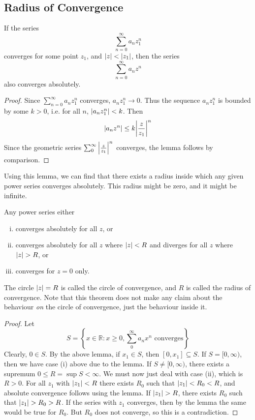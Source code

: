 \documentclass{article}
\begin{document}
\subsection{Radius of Convergence}
\begin{lemma}
    If the series
    \[ \sum_{n=0}^\infty a_n z_1^n \]
    converges for some point $z_1$, and $\abs{z} < \abs{z_1}$, then the series
    \[ \sum_{n=0}^\infty a_n z^n \]
    also converges absolutely.
\end{lemma}
\begin{proof}
    Since $\sum_{n=0}^\infty a_n z_1^n$ converges, $a_n z_1^n \to 0$. Thus the sequence $a_n z_1^n$ is bounded by some $k > 0$, i.e. for all $n$, $\abs{a_n z_1^n}<k$. Then
    \[ \abs{a_n z^n} \leq k\abs{\frac{z}{z_1}}^n \]
    Since the geometric series $\sum_0^\infty \abs{\frac{z}{z_1}}^n$ converges, the lemma follows by comparison.
\end{proof}
\noindent Using this lemma, we can find that there exists a radius inside which any given power series converges absolutely. This radius might be zero, and it might be infinite.
\begin{theorem}
    Any power series either
    \begin{enumerate}[(i)]
        \item converges absolutely for all $z$, or
        \item converges absolutely for all $z$ where $\abs{z} < R$ and diverges for all $z$ where $\abs{z} > R$, or
        \item converges for $z = 0$ only.
    \end{enumerate}
\end{theorem}
\noindent The circle $\abs{z} = R$ is called the circle of convergence, and $R$ is called the radius of convergence. Note that this theorem does not make any claim about the behaviour \textit{on} the circle of convergence, just the behaviour inside it.
\begin{proof}
    Let
    \[ S = \left\{ x \in \mathbb R \colon x \geq 0, \sum_0^\infty a_n x^n \text{ converges} \right\} \]
    Clearly, $0 \in S$. By the above lemma, if $x_1 \in S$, then $[0, x_1] \subseteq S$. If $S = [0, \infty)$, then we have case (i) above due to the lemma. If $S \neq [0, \infty)$, there exists a supremum $0 \leq R = \sup S < \infty$. We must now just deal with case (ii), which is $R > 0$. For all $z_1$ with $\abs{z_1} < R$ there exists $R_0$ such that $\abs{z_1} < R_0 < R$, and absolute convergence follows using the lemma. If $\abs{z_1} > R$, there exists $R_0$ such that $\abs{z_1} > R_0 > R$. If the series with $z_1$ converges, then by the lemma the same would be true for $R_0$. But $R_0$ does not converge, so this is a contradiction.
\end{proof}
\end{document}
